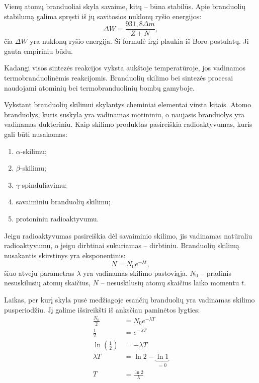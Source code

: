 Vienų atomų branduoliai skyla savaime, kitų – būna stabilūs. Apie
branduolių stabilumą galima spręsti iš jų savitosios nuklonų ryšio
energijos:
\begin{equation*}
  \Delta W = \frac{931,8 \Delta m}{Z + N},
\end{equation*}
čia $\Delta W$ yra nuklonų ryšio energija. Ši formulė irgi plaukia iš
Boro postulatų. Ji gauta empiriniu būdu.

Kadangi visos sintezės reakcijos vyksta aukštoje temperatūroje, jos
vadinamos termobranduolinėmis reakcijomis. Branduolių skilimo bei
sintezės procesai naudojami atominių bei termobranduolinių bombų
gamyboje.

Vykstant branduolių skilimui skylantys cheminiai elementai virsta kitais.
Atomo branduolys, kuris suskyla yra vadinamas motininiu, o naujasis
branduolys yra vadinamas dukteriniu. Kaip skilimo produktas pasireiškia
radioaktyvumas, kuris gali būti nusakomas:
\begin{enumerate}
  \item $\alpha$-skilimu;
  \item $\beta$-skilimu;
  \item $\gamma$-spinduliavimu;
  \item savaiminiu branduolių skilimu;
  \item protoniniu radioaktyvumu.
\end{enumerate}
Jeigu radioaktyvumas pasireiškia dėl savaiminio skilimo, jis vadinamas
natūraliu radioaktyvumu, o jeigu dirbtinai sukuriamas – dirbtiniu.
Branduolių skilimą nusakantis skirstinys yra eksponentinis:
\begin{equation*}
  N = N_{0} e^{-\lambda t},
\end{equation*}
šiuo atveju parametras $\lambda$ yra vadinamas skilimo pastoviąja.
$N_{0}$ – pradinis nesuskilusių atomų skaičius, $N$ – nesuskilusių
atomų skaičius laiko momentu $t$.

Laikas, per kurį skyla pusė medžiagoje esančių branduolių yra vadinamas
skilimo pusperiodžiu. Jį galime išsireikšti iš anksčiau paminėtos
lygties:
\begin{align*}
  \frac{N_{0}}{2} &= N_{0} e^{-\lambda T} \\
  \frac{1}{2} &= e^{-\lambda T} \\
  \ln \left( \frac{1}{2} \right) &= - \lambda T \\
  \lambda T &= \ln 2 - \underbrace{\ln 1}_{=0} \\
  T &= \frac{\ln 2}{\lambda} \\
\end{align*}

